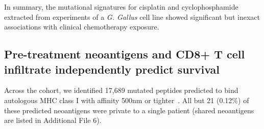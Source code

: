 \documentclass[linenumbers]{bmcart}
\begin{document}

In summary, the mutational signatures for cisplatin and cyclophosphamide extracted from experiments of a \textit{G. Gallus} cell line showed significant but inexact associations with clinical chemotherapy exposure. 

\subsection*{Pre-treatment neoantigens and CD8+ T cell infiltrate independently predict survival}

Across the cohort, we identified 17,689 mutated peptides predicted to bind autologous MHC class I with affinity 500nm or tighter~\cite{Sette1994}. All but 21 (0.12\%) of these predicted neoantigens were private to a single patient (shared neoantigens are listed in Additional File 6).




\end{document}
